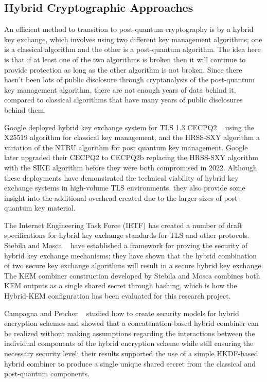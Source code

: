 \documentclass{ieeeaccess}
\begin{document}
\subsection{Hybrid Cryptographic Approaches}

An efficient method to transition to post-quantum cryptography is by a hybrid key exchange, which involves using two different key management algorithms; one is a classical algorithm and the other is a post-quantum algorithm. The idea here is that if at least one of the two algorithms is broken then it will continue to provide protection as long as the other algorithm is not broken. Since there hasn't been lots of public disclosure through cryptanalysis of the post-quantum key management algorithm, there are not enough years of data behind it, compared to classical algorithms that have many years of public disclosures behind them.

Google deployed hybrid key exchange system for TLS 1.3 CECPQ2 ~\cite{b4} using the X25519 algorithm for classical key management, and the HRSS-SXY algorithm a variation of the NTRU algorithm for post quantum key management. Google later upgraded their CECPQ2 to CECPQ2b replacing the HRSS-SXY algorithm with the SIKE algorithm before they were both compromised in 2022. Although these deployments have demonstrated the technical viability of hybrid key exchange systems in high-volume TLS environments, they also provide some insight into the additional overhead created due to the larger sizes of post-quantum key material.

The Internet Engineering Task Force (IETF) has created a number of draft specifications for hybrid key exchange standards for TLS and other protocols. Stebila and Mosca ~\cite{stebila2016} have established a framework for proving the security of hybrid key exchange mechanisms; they have shown that the hybrid combination of two secure key exchange algorithms will result in a secure hybrid key exchange. The KEM combiner construction developed by Stebila and Mosca combines both KEM outputs as a single shared secret through hashing, which is how the Hybrid-KEM configuration has been evaluated for this research project.

Campagna and Petcher ~\cite{campagna2020} studied how to create security models for hybrid encryption schemes and showed that a concatenation-based hybrid combiner can be realized without making assumptions regarding the interactions between the individual components of the hybrid encryption scheme while still ensuring the necessary security level; their results supported the use of a simple HKDF-based hybrid combiner to produce a single unique shared secret from the classical and post-quantum components.
\end{document}
